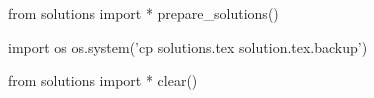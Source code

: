 
\begin{python0}
from solutions import *
prepare_solutions()
\end{python0}
\begin{python}
import os
os.system('cp solutions.tex solution.tex.backup')  
\end{python}

\begin{python0}
from solutions import *
clear()
\end{python0}
